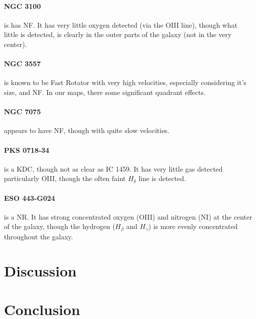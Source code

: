 \documentclass[fleqn,usenatbib,useAMS]{mnras}
\begin{document}
	\paragraph{NGC 3100} is has NF. It has very little oxygen detected (via the OIII line), though what little is detected, is clearly in the outer parts of the galaxy (not in the very center).

	\paragraph{NGC 3557} is known to be Fast Rotator with very high velocities, especially considering it's size, and NF. In our maps, there some significant quadrant effects.

	\paragraph{NGC 7075} appears to have NF, though with quite slow velocities.

	\paragraph{PKS 0718-34} is a KDC, though not as clear as IC 1459. It has very little gas detected particularly OIII, though the often faint $H_\delta$ line is detected. 

	\paragraph{ESO 443-G024} is a NR. It has strong concentrated oxygen (OIII) and nitrogen (NI) at the center of the galaxy, though the hydrogen ($H_\beta$ and $H_\gamma$) is more evenly concentrated throughout the galaxy.


	


\section{Discussion}
	\label{sec:discuss}

\section{Conclusion}
	\label{sec:conc}


%

{}

\appendix
\end{document}
